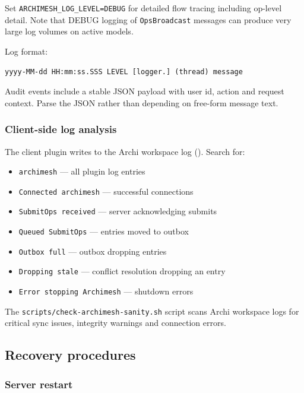 Set \texttt{ARCHIMESH\_LOG\_LEVEL=DEBUG} for detailed flow tracing including
op-level detail. Note that DEBUG logging of \texttt{OpsBroadcast} messages
can produce very large log volumes on active models.

Log format:

\begin{lstlisting}[caption={Log format}]
yyyy-MM-dd HH:mm:ss.SSS LEVEL [logger.] (thread) message
\end{lstlisting}

Audit events include a stable JSON payload with user id, action and request
context. Parse the JSON rather than depending on free-form message text.

\subsubsection{Client-side log analysis}

The client plugin writes to the Archi workspace log
(). Search for:

\begin{itemize}
\item \texttt{archimesh} --- all plugin log entries
\item \texttt{Connected archimesh} --- successful connections
\item \texttt{SubmitOps received} --- server acknowledging submits
\item \texttt{Queued SubmitOps} --- entries moved to outbox
\item \texttt{Outbox full} --- outbox dropping entries
\item \texttt{Dropping stale} --- conflict resolution dropping an entry
\item \texttt{Error stopping Archimesh} --- shutdown errors
\end{itemize}

The \texttt{scripts/check-archimesh-sanity.sh} script scans Archi workspace
logs for critical sync issues, integrity warnings and connection errors.

\subsection{Recovery procedures}

\subsubsection{Server restart}

